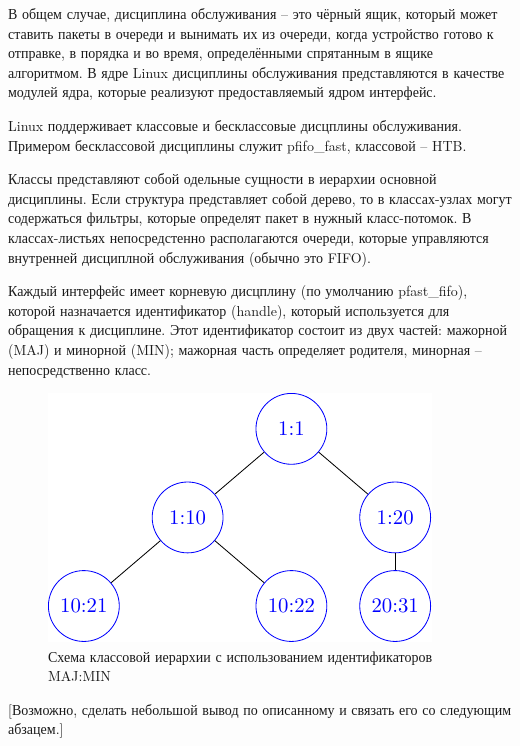 
	В общем случае, дисциплина обслуживания -- это чёрный ящик, который может
	ставить пакеты в очереди и вынимать их из очереди, когда устройство
	готово к отправке, в порядка и во время, определёнными спрятанным в ящике
	алгоритмом. В ядре Linux дисциплины обслуживания представляются в качестве
	модулей ядра, которые реализуют предоставляемый ядром интерфейс.

	Linux поддерживает классовые и бесклассовые дисцплины обслуживания. Примером
	бесклассовой дисциплины служит pfifo\_fast, классовой -- HTB.


	Классы представляют собой одельные сущности в иерархии основной дисциплины.
	Если структура представляет собой дерево, то в классах-узлах могут содержаться
	фильтры, которые определят пакет в нужный класс-потомок. В классах-листьях
	непосредстенно располагаются очереди, которые управляются внутренней дисциплной
	обслуживания (обычно это FIFO). 

	Каждый интерфейс имеет корневую дисцплину (по умолчанию pfast\_fifo), которой
	назначается идентификатор (handle), который используется для обращения к дисциплине.
	Этот идентификатор состоит из двух частей: мажорной (MAJ) и минорной (MIN); мажорная
	часть определяет родителя, минорная -- непосредственно класс.

	\begin{figure}[ht!]
		\centering
		\includegraphics{./pdfimages/class_hierh.pdf}
		\caption{Схема классовой иерархии с использованием идентификаторов MAJ:MIN}
	\end{figure}

	[Возможно, сделать небольшой вывод по описанному и связать его со следующим абзацем.]

